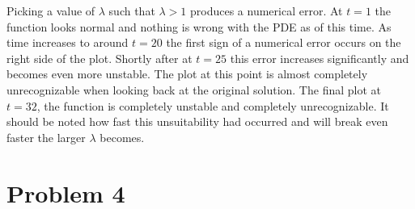 \documentclass[12pt]{article}
\begin{document}
Picking a value of $\lambda$ such that $\lambda > 1$ produces a numerical error. At $t = 1$ the function looks normal and nothing is wrong with the PDE as of this time. As time increases to around $t = 20$ the first sign of a numerical error occurs on the right side of the plot. Shortly after at $t = 25$ this error increases significantly and becomes even more unstable. The plot at this point is almost completely unrecognizable when looking back at the original solution. The final plot at $t = 32$, the function is completely unstable and completely unrecognizable. It should be noted how fast this unsuitability had occurred and will break even faster the larger $\lambda$ becomes.


\clearpage

\section*{Problem 4}
\end{document}
